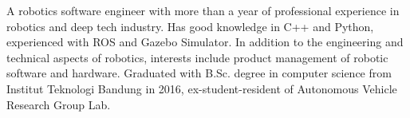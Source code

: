 

\begin{cvparagraph}
A robotics software engineer with more than a year of professional experience in robotics and deep tech industry. Has good knowledge in C++ and Python, experienced with ROS and Gazebo Simulator. In addition to the engineering and technical aspects of robotics, interests include product management of robotic software and hardware. Graduated with B.Sc. degree in computer science from Institut Teknologi Bandung in 2016, ex-student-resident of Autonomous Vehicle Research Group Lab.




\end{cvparagraph}

